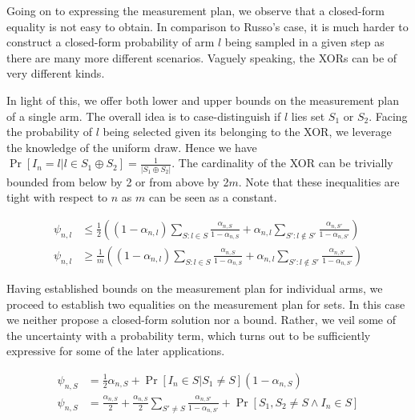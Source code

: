Going on to expressing the measurement plan, we observe that a closed-form
equality is not easy to obtain. In comparison to Russo's case, it is much harder
to construct a closed-form probability of arm $l$ being sampled in a given step
as there are many more different scenarios. Vaguely speaking, the XORs can be of
very different kinds.

In light of this, we offer both lower and upper bounds on the measurement plan of
a single arm. The overall idea is to case-distinguish if $l$ lies set $S_1$ or
$S_2$. Facing the probability of $l$ being selected given its belonging to the
XOR, we leverage the knowledge of the uniform draw. Hence we have $\Pr[I_n = l|l
\in S_1 \oplus S_2] = \frac{1}{|S_1 \oplus S_2|}$. The cardinality of the XOR
can be trivially bounded from below by 2 or from above by 2$m$. Note that these
inequalities are tight with respect to $n$ as $m$ can be seen as a constant.
\begin{proposition}\label{proposition:measurement_plan_arm}
  \begin{align}
    \psi_{n, l} &\leq \frac{1}{2}((1 - \alpha_{n, l}) \sum_{S: l \in S}
        \frac{\alpha_{n, S}}{1 - \alpha_{n, S}} + \alpha_{n, l} \sum_{S': l
        \notin S'} \frac{\alpha_{n, S'}}{1 - \alpha_{n, S'}}) \\
    \psi_{n, l} &\geq \frac{1}{m}((1 - \alpha_{n, l}) \sum_{S: l \in S}
        \frac{\alpha_{n, S}}{1 - \alpha_{n, S}} + \alpha_{n, l} \sum_{S': l
        \notin S'} \frac{\alpha_{n, S'}}{1 - \alpha_{n, S'}})
  \end{align}
\end{proposition}
Having established bounds on the measurement plan for individual arms, we
proceed to establish two equalities on the measurement plan for sets. In this
case we neither propose a closed-form solution nor a bound. Rather, we veil some
of the uncertainty with a probability term, which turns out to be sufficiently
expressive for some of the later applications.
\begin{proposition}\label{proposition:measurement_pan_set}
  \begin{align}
    \psi_{n, S} &= \frac{1}{2} \alpha_{n, S} +  \Pr[I_n \in S | S_1 \neq S] (1 - \alpha_{n, S}) \\
    \psi_{n, S} &= \frac{\alpha_{n, S}}{2} +  \frac{\alpha_{n, S}}{2} \sum_{S'\neq S} \frac{\alpha_{n, S'}}{1 - \alpha_{n, S'}} + \Pr[S_1, S_2 \neq S \wedge I_n \in S]
  \end{align}
\end{proposition}
